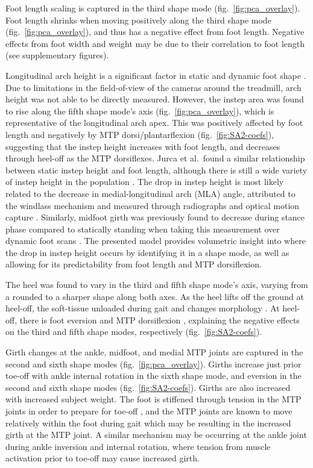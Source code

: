 \documentclass[defaultstyle,11pt]{thesis}
\begin{document}
Foot length scaling is captured in the third shape mode (fig.~\ref{fig:pca_overlay}).
Foot length shrinks when moving positively along the third shape mode (fig.~\ref{fig:pca_overlay}), and thus has a negative effect from foot length.
Negative effects from foot width and weight may be due to their correlation to foot length (see supplementary figures).

Longitudinal arch height is a significant factor in static \citep{Stankovic2020, Conrad2019} and dynamic foot shape \citep{Schuster2021} .
Due to limitations in the field-of-view of the cameras around the treadmill, arch height was not able to be directly measured.
However, the instep area was found to rise along the fifth shape mode's axis (fig.~\ref{fig:pca_overlay}), which is representative of the longitudinal arch apex.
This was positively affected by foot length and negatively by MTP dorsi/plantarflexion (fig.~\ref{fig:SA2-coefs}), suggesting that the instep height increases with foot length, and decreases through heel-off as the MTP dorsiflexes.
Jurca et al.~found a similar relationship between static instep height and foot length, although there is still a wide variety of instep height in the population \citep{Jurca2019}.
The drop in instep height is most likely related to the decrease in medial-longitudinal arch (MLA) angle, attributed to the windlass mechanism and measured through radiographs and optical motion capture \citep{Hicks1954, Caravaggi2010, Stolwijk2014}.
Similarly, midfoot girth was previously found to decrease during stance phase compared to statically standing when taking this measurement over dynamic foot scans \citep{Grau2018}.
The presented model provides volumetric insight into where the drop in instep height occurs by identifying it in a shape mode, as well as allowing for its predictability from foot length and MTP dorsiflexion.

The heel was found to vary in the third and fifth shape mode's axis, varying from a rounded to a sharper shape along both axes.
As the heel lifts off the ground at heel-off, the soft-tissue unloaded during gait and changes morphology \citep{Fontanella2013}.
At heel-off, there is foot eversion and MTP dorsiflexion \citep{Leardini2007}, explaining the negative effects on the third and fifth shape modes, respectively (fig.~\ref{fig:SA2-coefs}).

Girth changes at the ankle, midfoot, and medial MTP joints are captured in the second and sixth shape modes (fig.~\ref{fig:pca_overlay}).
Girths increase just prior toe-off with ankle internal rotation in the sixth shape mode, and eversion in the second and sixth shape modes (fig.~\ref{fig:SA2-coefs}).
Girths are also increased with increased subject weight.
The foot is stiffened through tension in the MTP joints in order to prepare for toe-off \citep{Hicks1954}, and the MTP joints are known to move relatively within the foot during gait \citep{Wolf2008, Lundgren2008} which may be resulting in the increased girth at the MTP joint.
A similar mechanism may be occurring at the ankle joint during ankle inversion and internal rotation, where tension from muscle activation prior to toe-off may cause increased girth.
\end{document}
